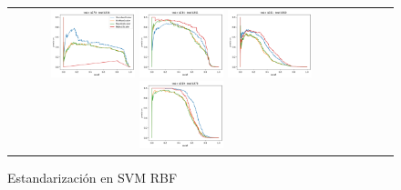 \begin{figure}[h!]
\begin{tabular}{cccc}
  \includegraphics[width=0.25\textwidth]{Kap4/kFigure_1.png}  \includegraphics[width=0.25\textwidth]{Kap4/kFigure_2.png}
  \includegraphics[width=0.25\textwidth]{Kap4/kFigure_3.png}  \includegraphics[width=0.25\textwidth]{Kap4/kFigure_4.png} 
\end{tabular}
\caption{Estandarización en SVM RBF}
\label{fig:svmk_estandarizacion}
\end{figure}

